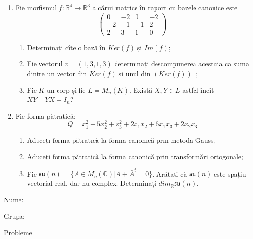 \documentclass{article}
\begin{document}
\begin{enumerate}
 \item Fie morfismul $f:\mathbb{R}^4 \to \mathbb{R}^3$ a cărui matrice în raport cu bazele canonice este
$$\begin{pmatrix}
0&-2&0&-2\\
-2&-1&-1&2\\
2&3&1&0
\end{pmatrix}$$

\begin{enumerate}
\item Determinați cîte o bază în $Ker(f)$ și $Im(f)$;
\item Fie vectorul $v=(1,3,1,3)$ determinați descompunerea acestuia ca suma dintre un vector din $Ker(f)$ și unul din $(Ker(f))^\perp$;
\item Fie $K$ un corp și fie $L=M_n(K)$. Există $X,Y \in L$ astfel încît $XY-YX=I_n$?  
\end{enumerate}
\item Fie forma pătratică:
$$Q= x_1^2+5x_2^2+x_3^2+2x_1x_2+6x_1x_3+2x_2x_3$$

\begin{enumerate}
\item Aduceți forma pătratică la forma canonică prin metoda Gauss;
\item Aduceți forma pătratică la forma canonică prin transformări ortogonale;
\item Fie $\mathfrak{su}(n)=\{ A \in M_n(\mathbb{C}) | A+\bar{A}^t=0\}$. Arătați că $\mathfrak{su}(n)$ este spațiu vectorial real, dar nu complex.
Determinați $dim_{\mathbb{R}}\mathfrak{su}(n)$.
\end{enumerate}
\end{enumerate}
\newpage
\begin{flushright}
Nume:\_\_\_\_\_\_\_\_\_\_\_\_\_\_
 
 
Grupa:\_\_\_\_\_\_\_\_\_\_\_\_\_\_
\end{flushright}
\begin{center}
\vspace{2cm}
{\Large Probleme}
\vspace{2cm}
\end{center}
\end{document}

